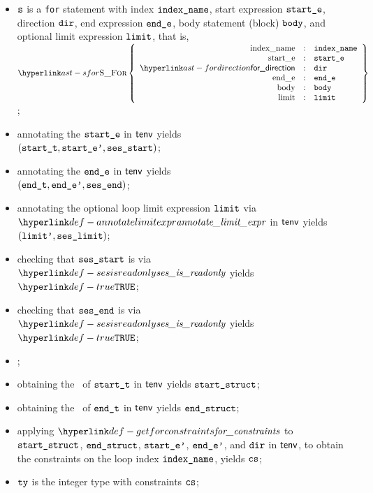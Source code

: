 \ProseParagraph
\AllApply
\begin{itemize}
  \item $\texttt{s}$ is a \texttt{for} statement with index $\texttt{index\_name}$,
        start expression $\texttt{start\_e}$,
        direction $\texttt{dir}$,
        end expression $\texttt{end\_e}$,
        body statement (block) $\texttt{body}$,
        and optional limit expression $\texttt{limit}$,
        that is, $\SFor\left\{\begin{array}{rcl}
          \Forindexname &:& \vindexname\\
          \Forstarte &:& \vstarte\\
          \fordirection &:& \vdir\\
          \Forende &:& \vende\\
          \Forbody &:& \vbody\\
          \Forlimit &:& \vlimit
        \end{array}\right\}$;
  \item annotating the \rhsexpression{} $\texttt{start\_e}$ in $\textsf{tenv}$ yields \\
        $(\texttt{start\_t}, \texttt{start\_e'}, \texttt{ses\_start})$\ProseOrTypeError;
  \item annotating the \rhsexpression{} $\texttt{end\_e}$ in $\textsf{tenv}$ yields \\ $(\texttt{end\_t}, \texttt{end\_e'}, \texttt{ses\_end})$\ProseOrTypeError;
  \item annotating the optional loop limit expression $\texttt{limit}$ via $\annotatelimitexpr$ in $\textsf{tenv}$
        yields $(\texttt{limit'}, \texttt{ses\_limit})$\ProseOrTypeError;
  \item checking that $\texttt{ses\_start}$ is \readonly{} via $\sesisreadonly$ yields $\True$\ProseOrTypeError;
  \item checking that $\texttt{ses\_end}$ is \readonly{} via $\sesisreadonly$ yields $\True$\ProseOrTypeError;
  \item {};
  \item obtaining the \underlyingtype\ of $\texttt{start\_t}$ in $\textsf{tenv}$ yields $\texttt{start\_struct}$\ProseOrTypeError;
  \item obtaining the \underlyingtype\ of $\texttt{end\_t}$ in $\textsf{tenv}$ yields $\texttt{end\_struct}$\ProseOrTypeError;
  \item applying $\getforconstraints$ to $\texttt{start\_struct}$, $\texttt{end\_struct}$,
        $\texttt{start\_e'}$, $\texttt{end\_e'}$, and $\texttt{dir}$ in $\textsf{tenv}$,
        to obtain the constraints on the loop index $\texttt{index\_name}$,
        yields $\texttt{cs}$\ProseOrTypeError;
  \item $\texttt{ty}$ is the integer type with constraints $\texttt{cs}$;

\end{itemize}
